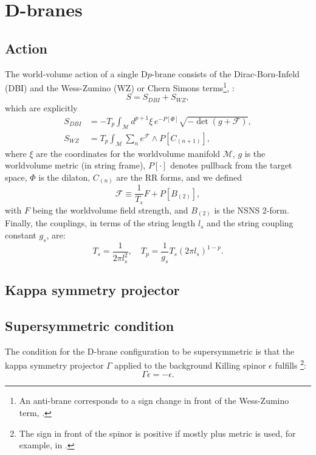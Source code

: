 \section{D-branes}\label{sec:Dbranes}

\subsection{Action}
The world-volume action of a single D$p$-brane consists of the Dirac-Born-Infeld (DBI) and the Wess-Zumino (WZ) or Chern Simons terms\footnote{An anti-brane corresponds to a sign change in front of the Wess-Zumino term, \cite{Kruczenski:2003be}.},
\cite{Ammon:2015wua}:
\begin{equation}
 S = S_{DBI} + S_{WZ},
\end{equation}
which are explicitly
\begin{align}
 S_{DBI} & = 
 -T_p \int_\mathcal{M} d^{p+1}\xi \, e^{-P[\Phi] } \sqrt{-\det (g+\mathcal{F})},\\
 S_{WZ} & =
 T_p\int _\mathcal{M} \sum_n e^{\mathcal{F}}\wedge P[C_{(n+1)}],
\end{align}
where $\xi$ are the coordinates for the worldvolume manifold $\mathcal{M}$, $g$ is the worldvolume metric (in string frame), $P[\cdot]$ denotes pullback from the target space, $\Phi$ is the dilaton, $C_{(n)}$ are the RR forms, and we defined
\begin{equation}
 \mathcal{F} \equiv \frac{1}{T_s} F + P[B_{(2)}], 
\end{equation}
with $F$ being the worldvolume field strength, and $B_{(2)}$ is the NSNS 2-form. Finally, the couplings, in terms of the string length $l_s$ and the string coupling constant $g_s$, are:
\begin{equation}
 T_{s} = \dfrac{1}{2\pi l_s^2}, \quad T_p = \dfrac{1}{g_s} T_s (2\pi l_s)^{1-p}.
\end{equation}


\subsection{Kappa symmetry projector}



\subsection{Supersymmetric condition}
The condition for the D-brane configuration to be supersymmetric is that the kappa symmetry projector $\Gamma$ applied to the background Killing spinor $\epsilon$ fulfills
\footnote{The sign in front of the spinor is positive if mostly plus metric is used, for example, in \cite{Skenderis:2002vf}.}:
\begin{equation} \label{eq:susyCondition}
 \Gamma \epsilon = - \epsilon.
\end{equation}


